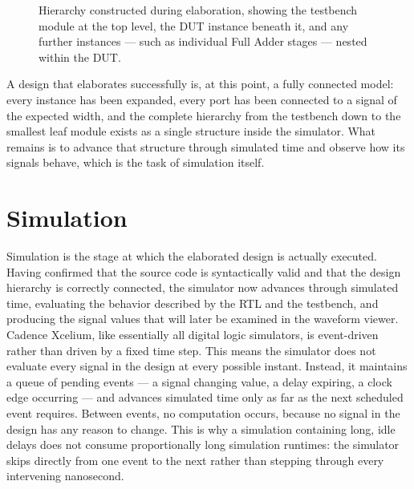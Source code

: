 
\begin{figure}[h]
\centering
\caption{Hierarchy constructed during elaboration, showing the testbench module at the top level, the DUT instance beneath it, and any further instances --- such as individual Full Adder stages --- nested within the DUT.}
\label{fig:elaboration_hierarchy}
\end{figure}

A design that elaborates successfully is, at this point, a fully connected model: every instance has been expanded, every port has been connected to a signal of the expected width, and the complete hierarchy from the testbench down to the smallest leaf module exists as a single structure inside the simulator. What remains is to advance that structure through simulated time and observe how its signals behave, which is the task of simulation itself.

\section{Simulation}

Simulation is the stage at which the elaborated design is actually executed. Having confirmed that the source code is syntactically valid and that the design hierarchy is correctly connected, the simulator now advances through simulated time, evaluating the behavior described by the RTL and the testbench, and producing the signal values that will later be examined in the waveform viewer.\\

Cadence Xcelium, like essentially all digital logic simulators, is event-driven rather than driven by a fixed time step. This means the simulator does not evaluate every signal in the design at every possible instant. Instead, it maintains a queue of pending events --- a signal changing value, a delay expiring, a clock edge occurring --- and advances simulated time only as far as the next scheduled event requires. Between events, no computation occurs, because no signal in the design has any reason to change. This is why a simulation containing long, idle delays does not consume proportionally long simulation runtimes: the simulator skips directly from one event to the next rather than stepping through every intervening nanosecond.\\

